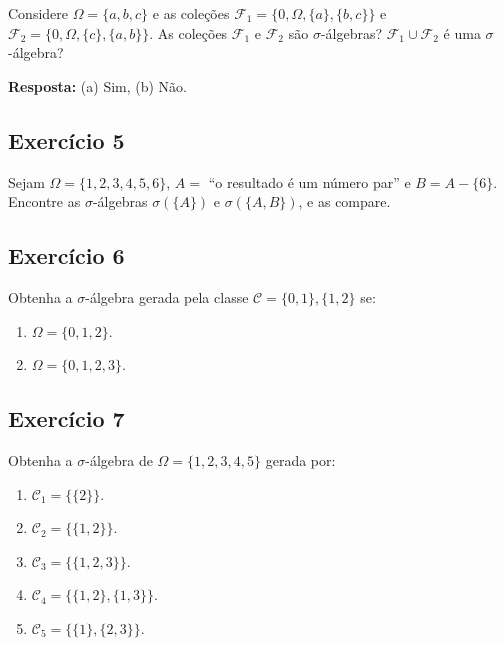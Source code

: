 \documentclass[
  letterpaper,
  DIV=11,
  numbers=noendperiod]{scrartcl}
\begin{document}
Considere \(\Omega = \{a, b, c\}\) e as coleções
\(\mathcal{F}_1 = \{0, \Omega, \{a\}, \{b, c\}\}\) e
\(\mathcal{F}_2 = \{0, \Omega, \{c\}, \{a, b\}\}\). As coleções
\(\mathcal{F}_1\) e \(\mathcal{F}_2\) são \(\sigma\)-álgebras?
\(\mathcal{F}_1 \cup \mathcal{F}_2\) é uma \(\sigma\)-álgebra?

\textbf{Resposta:} (a) Sim, (b) Não.

\hypertarget{exercuxedcio-5}{%
\subsection{Exercício 5}\label{exercuxedcio-5}}

Sejam \(\Omega = \{1, 2, 3, 4, 5, 6\}\), \(A =\) ``o resultado é um
número par'' e \(B = A - \{6\}\). Encontre as \(\sigma\)-álgebras
\(\sigma(\{A\})\) e \(\sigma(\{A, B\})\), e as compare.

\hypertarget{exercuxedcio-6}{%
\subsection{Exercício 6}\label{exercuxedcio-6}}

Obtenha a \(\sigma\)-álgebra gerada pela classe
\(\mathcal{C} = \{0, 1\}, \{1, 2\}\) se:

\begin{enumerate}
\def\labelenumi{(\alph{enumi})}
\item
  \(\Omega = \{0, 1, 2\}\).
\item
  \(\Omega = \{0, 1, 2, 3\}\).
\end{enumerate}

\hypertarget{exercuxedcio-7}{%
\subsection{Exercício 7}\label{exercuxedcio-7}}

Obtenha a \(\sigma\)-álgebra de \(\Omega = \{1, 2, 3, 4, 5\}\) gerada
por:

\begin{enumerate}
\def\labelenumi{(\alph{enumi})}
\item
  \(\mathcal{C}_1 = \{\{2\}\}\).
\item
  \(\mathcal{C}_2 = \{\{1, 2\}\}\).
\item
  \(\mathcal{C}_3 = \{\{1, 2, 3\}\}\).
\item
  \(\mathcal{C}_4 = \{\{1, 2\}, \{1, 3\}\}\).
\item
  \(\mathcal{C}_5 = \{\{1\}, \{2, 3\}\}\).
\end{enumerate}
\end{document}
